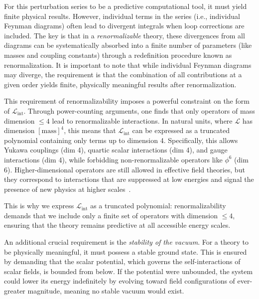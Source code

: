 For this perturbation series to be a predictive computational tool, it must yield finite physical results. However, individual terms in the series (i.e., individual Feynman diagrams) often lead to divergent integrals when loop corrections are included. The key is that in a \textit{renormalizable} theory, these divergences from all diagrams can be systematically absorbed into a finite number of parameters (like masses and coupling constants) through a redefinition procedure known as renormalization. It is important to note that while individual Feynman diagrams may diverge, the requirement is that the combination of all contributions at a given order yields finite, physically meaningful results after renormalization.

This requirement of renormalizability imposes a powerful constraint on the form of $\mathcal{L}_{\text{int}}$. Through power-counting arguments, one finds that only operators of mass dimension $\leq 4$ lead to renormalizable interactions. In natural units, where $\mathcal{L}$ has dimension $[\text{mass}]^4$, this means that $\mathcal{L}_{\text{int}}$ can be expressed as a truncated polynomial containing only terms up to dimension 4. Specifically, this allows Yukawa couplings (dim 4), quartic scalar interactions (dim 4), and gauge interactions (dim 4), while forbidding non-renormalizable operators like $\phi^6$ (dim 6). Higher-dimensional operators are still allowed in effective field theories, but they correspond to interactions that are suppressed at low energies and signal the presence of new physics at higher scales~\parencite{peskin,Weinberg}.

This is why we express $\mathcal{L}_{\text{int}}$ as a truncated polynomial: renormalizability demands that we include only a finite set of operators with dimension $\leq 4$, ensuring that the theory remains predictive at all accessible energy scales.

An additional crucial requirement is the \textit{stability of the vacuum}. For a theory to be physically meaningful, it must possess a stable ground state. This is ensured by demanding that the scalar potential, which governs the self-interactions of scalar fields, is bounded from below. If the potential were unbounded, the system could lower its energy indefinitely by evolving toward field configurations of ever-greater magnitude, meaning no stable vacuum would exist.

